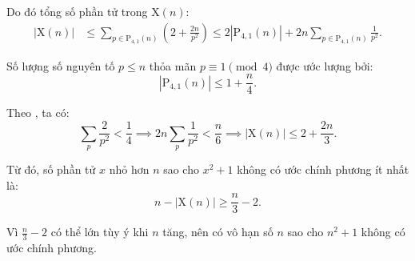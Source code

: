 \documentclass[../05-largest-exponent.tex]{subfiles}
\begin{document}
\begin{soln}
	Do đó tổng số phần tử trong \( \text{X}(n) \):
	\[
		\begin{aligned}
			|\text{X}(n)| &\le \sum_{p\in\text{P}_{4,1}(n)} \left(2 + \frac{2n}{p^2} \right)
			\le 2|\text{P}_{4,1}(n)|  + 2n \sum_{p\in\text{P}_{4,1}(n)} \frac{1}{p^2}.
		\end{aligned}
	\]

	Số lượng số nguyên tố \( p \leq n \) thỏa mãn \( p \equiv 1 \pmod{4} \) được ước lượng bởi:
	\[
		|\text{P}_{4,1}(n)| \leq 1 + \frac{n}{4}.
	\]

	Theo , ta có:
	\[
		\sum_{p} \frac{2}{p^2} < \frac{1}{4} \implies 2n\sum_{p} \frac{1}{p^2} < \frac{n}{6} \implies |\text{X}(n)| \leq 2 + \frac{2n}{3}.
	\]
	
	Từ đó, số phần tử \( x \) nhỏ hơn \( n \) sao cho \( x^2 + 1 \) không có ước chính phương ít nhất là:
	\[
		n - |\text{X}(n)| \geq \frac{n}{3} - 2.
	\]

	Vì \( \frac{n}{3} - 2 \) có thể lớn tùy ý khi \( n \) tăng, nên có vô hạn số \( n \) sao cho \( n^2 + 1 \) không có ước chính phương.
\end{soln}

\end{document}

